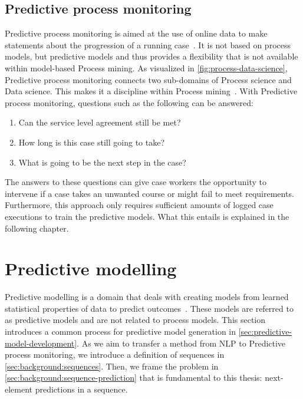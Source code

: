 \subsection{Predictive process monitoring}\label{sec:predictive-process-monitoring}
Predictive process monitoring is aimed at the use of online data to make statements about the progression of a running case~\cite{francescomarino2015, schoenig2018}. It is not based on process models, but predictive models and thus provides a flexibility that is not available within model-based Process mining.  As visualized in \autoref{fig:process-data-science}, Predictive process monitoring connects two sub-domains of Process science and Data science. This makes it a discipline within Process mining~\cite{Aalst2016}. With Predictive process monitoring, questions such as the following can be answered:

\begin{enumerate}
    \item Can the service level agreement still be met?
    \item How long is this case still going to take?
    \item What is going to be the next step in the case?
\end{enumerate}

The answers to these questions can give case workers the opportunity to intervene if a case takes an unwanted course or might fail to meet requirements. Furthermore, this approach only requires sufficient amounts of logged case executions to train the predictive models. What this entails is explained in the following chapter.

\section{Predictive modelling}\label{sec:predictive-modeling}
Predictive modelling is a domain that deals with creating models from learned statistical properties of data to predict outcomes~\cite{sivaganesan1994predictive}. These models are referred to as predictive models and are not related to process models. This section introduces a common process for predictive model generation in \autoref{sec:predictive-model-development}.
As we aim to transfer a method from NLP to Predictive process monitoring, we introduce a definition of sequences in \autoref{sec:background:sequences}. Then, we frame the problem in \autoref{sec:background:sequence-prediction} that is fundamental to this thesis: next-element predictions in a sequence.

